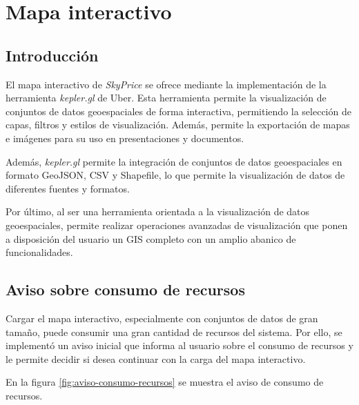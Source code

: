 \chapter{\textcolor{azulescom}{Mapa interactivo}}

\section{Introducción}
El mapa interactivo de \textit{SkyPrice} se ofrece mediante la implementación
de la herramienta \textit{kepler.gl} de Uber. Esta herramienta permite la
visualización de conjuntos de datos geoespaciales de forma interactiva,
permitiendo la selección de capas, filtros y estilos de visualización.
Además, permite la exportación de mapas e imágenes para su uso en
presentaciones y documentos.

Además, \textit{kepler.gl} permite la integración de conjuntos de datos
geoespaciales en formato GeoJSON, CSV y Shapefile, lo que permite la
visualización de datos de diferentes fuentes y formatos.

Por último, al ser una herramienta orientada a la visualización de datos
geoespaciales, permite realizar operaciones avanzadas de visualización que
ponen a disposición del usuario un GIS completo con un amplio abanico de
funcionalidades.

\section{Aviso sobre consumo de recursos}
Cargar el mapa interactivo, especialmente con conjuntos de datos de gran
tamaño, puede consumir una gran cantidad de recursos del sistema. Por ello,
se implementó un aviso inicial que informa al usuario sobre el consumo de
recursos y le permite decidir si desea continuar con la carga del mapa
interactivo.

En la figura \ref{fig:aviso-consumo-recursos} se muestra el aviso de consumo
de recursos.

